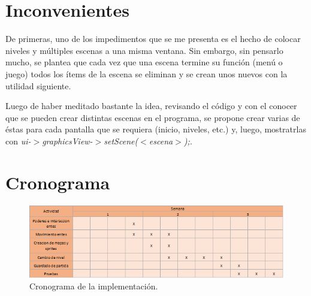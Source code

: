 \documentclass{article}
\begin{document}
\section{Inconvenientes}
De primeras, uno de los impedimentos que se me presenta es el hecho de colocar niveles y múltiples escenas a una misma ventana. Sin embargo, sin pensarlo mucho, se plantea que cada vez que una escena termine su función (menú o juego) todos los ítems de la escena se eliminan y se crean unos nuevos con la utilidad siguiente.
\par Luego de haber meditado bastante la idea, revisando el código y con el conocer que se pueden crear distintas escenas en el programa, se propone crear varias de éstas para cada pantalla que se requiera (inicio, niveles, etc.) y, luego, mostratrlas con \textsl{ui-$>$graphicsView-$>$setScene($<$escena$>$);}.

\section{Cronograma}
\begin{figure}[h]
\includegraphics[width=12cm]{imagenes/cronograma.png}
\centering
\caption{Cronograma de la implementación.}
\label{fig:diagram}
\end{figure}
\end{document}
